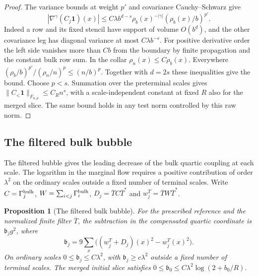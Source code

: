 \documentclass[11pt]{article}
\newtheorem{proposition}[theorem]{Proposition}
\theoremstyle{definition}
\newcommand{\one}{\mathbf 1}
\begin{document}
\begin{proof}
The variance bounds at weight \(p'\) and covariance
Cauchy--Schwarz give
\begin{equation}
 |\nabla^\gamma(C_j\one)(x)|
 \le C \lambda b^{d-s}\rho_b(x)^{-|\gamma|}
       (\rho_b(x)/b)^{p'} .
\end{equation}
Indeed a row and its fixed stencil have support of volume \(O(b^d)\),
and the other covariance leg has diagonal variance at most
\(C\lambda b^{-s}\). For positive derivative order the left side
vanishes more than \(Cb\) from the boundary by finite propagation
and the constant bulk row sum. In the collar
\(\rho_n(x)\le C\rho_b(x)\).
Everywhere \((\rho_b/b)^{p'}/(\rho_n/n)^p\le (n/b)^p\).
Together with \(d=2s\) these inequalities give the bound.
Choose \(p<s\). Summation over the preterminal scales gives
\(\|C_<\one\|_{F_{n,p}}\le C_{R} n^s\), with a scale-independent
constant at fixed \(R\) also for the merged slice. The same bound
holds in any test norm controlled by this raw norm.
\end{proof}

\subsection{The filtered bulk bubble}\label{sec:bubble}

The filtered bubble gives the leading decrease of the bulk quartic
coupling at each scale. The logarithm in the marginal flow requires a
positive contribution of order \(\lambda^2\) on the ordinary scales
outside a fixed number of terminal scales.
Write \(C=\Gamma_j^{\rm bulk}\), \(W=\sum_{i<j}\Gamma_i^{\rm bulk}\),
\(D_j=\overline T C\overline T^*\) and
\(w_j^T=\overline T W\overline T^*\).

\begin{proposition}[The filtered bulk bubble]
\label{prop:filtered-bulk-bubble}
For the prescribed reference and the normalized finite filter
\(\overline T\), the subtraction in the
compensated quartic coordinate is \(\mathfrak b_j g^2\), where
\begin{equation}
 \mathfrak b_j=9\sum_x\bigl((w_j^T+D_j)(x)^2-w_j^T(x)^2\bigr).
\end{equation}
On ordinary scales \(0\le\mathfrak b_j\le C\lambda^2\), with
\(\mathfrak b_j\ge c\lambda^2\) outside a fixed number of
terminal scales. The merged initial slice satisfies
\(0\le\mathfrak b_0\le C\lambda^2\log(2+b_0/R)\).
\end{proposition}
\end{document}
